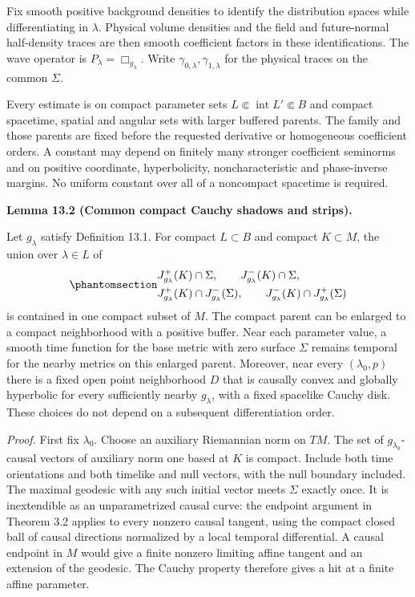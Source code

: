 \documentclass[
  english,
  11pt,
  reqno]{amsart}
\makeatletter
\newcommand{\pandocstatementheading}[1]{%
  \par\if@nobreak\else
    \addpenalty{\@beginparpenalty}%
    \addvspace{.5\baselineskip plus .2\baselineskip minus .2\baselineskip}%
  \fi
  {\normalfont\bfseries #1\par}%
  \nobreak\@afterindenttrue\@afterheading
}
\makeatother
\begin{document}
Fix smooth positive background densities to identify the distribution
spaces while differentiating in \(\lambda\). Physical volume densities
and the field and future-normal half-density traces are then smooth
coefficient factors in these identifications. The wave operator is
\(P_\lambda=\Box_{g_\lambda}\). Write
\(\gamma_{0,\lambda},\gamma_{1,\lambda}\) for the physical traces on the
common \(\Sigma\).

Every estimate is on compact parameter sets
\(L\Subset\operatorname{int}L'\Subset B\) and compact spacetime, spatial
and angular sets with larger buffered parents. The family and those
parents are fixed before the requested derivative or homogeneous
coefficient orders. A constant may depend on finitely many stronger
coefficient seminorms and on positive coordinate, hyperbolicity,
noncharacteristic and phase-inverse margins. No uniform constant over
all of a noncompact spacetime is required.

\pandocstatementheading{\protect{}\label{lem:family-compact-cauchy-parents}Lemma 13.2 (Common compact Cauchy shadows and strips).}

Let \(g_\lambda\) satisfy Definition 13.1. For compact \(L\subset B\)
and compact \(K\subset M\), the union over \(\lambda\in L\) of
\begin{equation}\protect\phantomsection\label{eq:family-common-causal-strips}{
\begin{aligned}
&J^+_{g_\lambda}(K)\cap\Sigma,
\qquad J^-_{g_\lambda}(K)\cap\Sigma,\\
&J^+_{g_\lambda}(K)\cap J^-_{g_\lambda}(\Sigma),
\qquad J^-_{g_\lambda}(K)\cap J^+_{g_\lambda}(\Sigma)
\end{aligned}
}\end{equation} is contained in one compact subset of \(M\). The compact
parent can be enlarged to a compact neighborhood with a positive buffer.
Near each parameter value, a smooth time function for the base metric
with zero surface \(\Sigma\) remains temporal for the nearby metrics on
this enlarged parent. Moreover, near every \((\lambda_0,p)\) there is a
fixed open point neighborhood \(D\) that is causally convex and globally
hyperbolic for every sufficiently nearby \(g_\lambda\), with a fixed
spacelike Cauchy disk. These choices do not depend on a subsequent
differentiation order.

\emph{Proof.} First fix \(\lambda_0\). Choose an auxiliary Riemannian
norm on \(TM\). The set of \(g_{\lambda_0}\)-causal vectors of auxiliary
norm one based at \(K\) is compact. Include both time orientations and
both timelike and null vectors, with the null boundary included. The
maximal geodesic with any such initial vector meets \(\Sigma\) exactly
once. It is inextendible as an unparametrized causal curve: the endpoint
argument in Theorem 3.2 applies to every nonzero causal tangent, using
the compact closed ball of causal directions normalized by a local
temporal differential. A causal endpoint in \(M\) would give a finite
nonzero limiting affine tangent and an extension of the geodesic. The
Cauchy property therefore gives a hit at a finite affine parameter.
\end{document}
